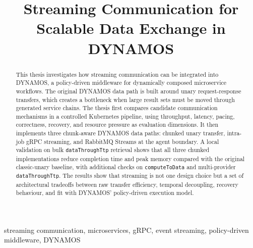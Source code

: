 \documentclass[conference,a4paper]{IEEEtran}
\title{Streaming Communication for Scalable Data Exchange in DYNAMOS}
\author{%
\IEEEauthorblockN{Ruben Stoop}
\IEEEauthorblockA{Complex Cyber-Infrastructure (CCI)\\
University of Amsterdam\\
Amsterdam, the Netherlands}
}
\begin{document}

\maketitle

\begin{abstract}
This thesis investigates how streaming communication can be integrated into DYNAMOS, a policy-driven middleware for dynamically composed microservice workflows. The original DYNAMOS data path is built around unary request-response transfers, which creates a bottleneck when large result sets must be moved through generated service chains. The thesis first compares candidate communication mechanisms in a controlled Kubernetes pipeline, using throughput, latency, pacing, correctness, recovery, and resource pressure as evaluation dimensions. It then implements three chunk-aware DYNAMOS data paths: chunked unary transfer, intra-job gRPC streaming, and RabbitMQ Streams at the agent boundary. A local validation on bulk \texttt{dataThroughTtp} retrieval shows that all three chunked implementations reduce completion time and peak memory compared with the original classic-unary baseline, with additional checks on \texttt{computeToData} and multi-provider \texttt{dataThroughTtp}. The results show that streaming is not one design choice but a set of architectural tradeoffs between raw transfer efficiency, temporal decoupling, recovery behaviour, and fit with DYNAMOS' policy-driven execution model.

\end{abstract}

\begin{IEEEkeywords}
streaming communication, microservices, gRPC, event streaming, policy-driven middleware, DYNAMOS
\end{IEEEkeywords}








\clearpage



\clearpage
\onecolumn
\raggedbottom
\appendices


\clearpage

\clearpage

\clearpage

\clearpage

\end{document}
